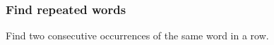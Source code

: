 \begin{frame}[fragile]
  \frametitle{Find repeated words}
  Find two consecutive occurrences of the same word in a row.
\end{frame}
